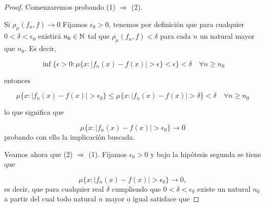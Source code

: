 
\begin{proof}
    Comenzaremos probando (1) $\Rightarrow$ (2). 

    Si $\rho_{\mu}(f_n, f) \longrightarrow 0$
    Fijamos $\epsilon_0 > 0$, tenemos por definición que 
    para cualquier $0 < \delta < \epsilon_0$ existirá $n_0 \in \mathbb{N}$ tal que 
    $\rho_{\mu}(f_n, f) < \delta$ para cada $n$ un natural mayor que $n_0$. Es decir,  
    

    $$\inf \{ \epsilon > 0: \mu \{ x : |f_n(x) - f(x)| > \epsilon \} < \epsilon \} < \delta \quad \forall n \geq n_0$$

    entonces 

    \begin{equation}
        \mu \{ x : |f_n(x) - f(x)| > \epsilon_0 \}
        \leq
        \mu \{ x : |f_n(x) - f(x)| > \delta\}
        < \delta 
        \quad 
        \forall n \geq n_0
    \end{equation}

    lo que significa que 

    \begin{equation}
        \mu \{ x : |f_n(x) - f(x)| > \epsilon_0 \}
        \longrightarrow
        0  
    \end{equation}
    probando con ello la implicación buscada.

    Veamos ahora que (2) $\Rightarrow$ (1). 
    Fijamos $\epsilon_0 > 0$ y bajo la hipótesis segunda se tiene que 

    \begin{equation}
        \mu \{ x : |f_n(x) - f(x)| > \epsilon_0 \}
        \longrightarrow
        0,  
    \end{equation}
    es decir, que para cualquier real $\delta$ cumpliendo que $0 < \delta < \epsilon_0$ 
    existe un natural $n_0$ a partir del cual todo natural $n$ mayor o igual satisface que 
    

\end{proof}
